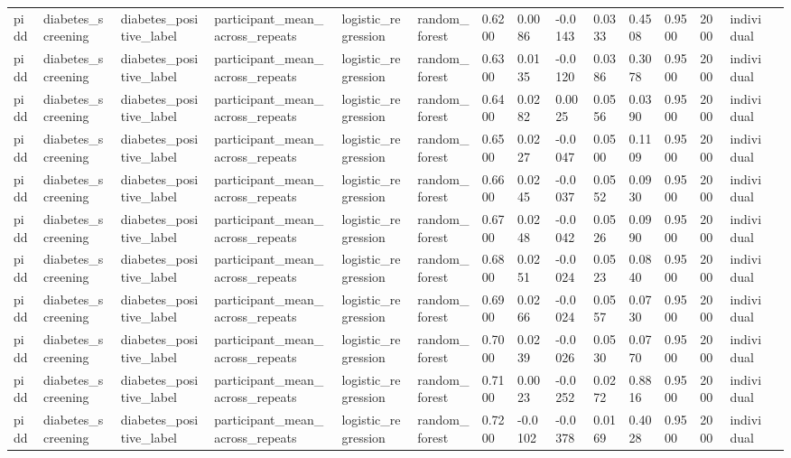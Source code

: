 \begin{tabular}{lllllllllllllll}
pidd & diabetes\_screening & diabetes\_positive\_label & participant\_mean\_across\_repeats & logistic\_regression & random\_forest & 0.6200 & 0.0086 & -0.0143 & 0.0333 & 0.4508 & 0.9500 & 2000 & individual &  \\
pidd & diabetes\_screening & diabetes\_positive\_label & participant\_mean\_across\_repeats & logistic\_regression & random\_forest & 0.6300 & 0.0135 & -0.0120 & 0.0386 & 0.3078 & 0.9500 & 2000 & individual &  \\
pidd & diabetes\_screening & diabetes\_positive\_label & participant\_mean\_across\_repeats & logistic\_regression & random\_forest & 0.6400 & 0.0282 & 0.0025 & 0.0556 & 0.0390 & 0.9500 & 2000 & individual &  \\
pidd & diabetes\_screening & diabetes\_positive\_label & participant\_mean\_across\_repeats & logistic\_regression & random\_forest & 0.6500 & 0.0227 & -0.0047 & 0.0500 & 0.1109 & 0.9500 & 2000 & individual &  \\
pidd & diabetes\_screening & diabetes\_positive\_label & participant\_mean\_across\_repeats & logistic\_regression & random\_forest & 0.6600 & 0.0245 & -0.0037 & 0.0552 & 0.0930 & 0.9500 & 2000 & individual &  \\
pidd & diabetes\_screening & diabetes\_positive\_label & participant\_mean\_across\_repeats & logistic\_regression & random\_forest & 0.6700 & 0.0248 & -0.0042 & 0.0526 & 0.0990 & 0.9500 & 2000 & individual &  \\
pidd & diabetes\_screening & diabetes\_positive\_label & participant\_mean\_across\_repeats & logistic\_regression & random\_forest & 0.6800 & 0.0251 & -0.0024 & 0.0523 & 0.0840 & 0.9500 & 2000 & individual &  \\
pidd & diabetes\_screening & diabetes\_positive\_label & participant\_mean\_across\_repeats & logistic\_regression & random\_forest & 0.6900 & 0.0266 & -0.0024 & 0.0557 & 0.0730 & 0.9500 & 2000 & individual &  \\
pidd & diabetes\_screening & diabetes\_positive\_label & participant\_mean\_across\_repeats & logistic\_regression & random\_forest & 0.7000 & 0.0239 & -0.0026 & 0.0530 & 0.0770 & 0.9500 & 2000 & individual &  \\
pidd & diabetes\_screening & diabetes\_positive\_label & participant\_mean\_across\_repeats & logistic\_regression & random\_forest & 0.7100 & 0.0023 & -0.0252 & 0.0272 & 0.8816 & 0.9500 & 2000 & individual &  \\
pidd & diabetes\_screening & diabetes\_positive\_label & participant\_mean\_across\_repeats & logistic\_regression & random\_forest & 0.7200 & -0.0102 & -0.0378 & 0.0169 & 0.4028 & 0.9500 & 2000 & individual &  \\

\end{tabular}

